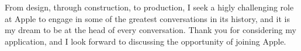 \documentclass[11pt,a4paper,sans]{moderncv}        %
\begin{document}
From design, through construction, to production, I seek a higly challenging role at Apple to engage in some of the greatest conversations in its history, and it is my dream to be at the head of every conversation. Thank you for considering my application, and I look forward to discussing the opportunity of joining Apple.


\makeletterclosing
\end{document}
